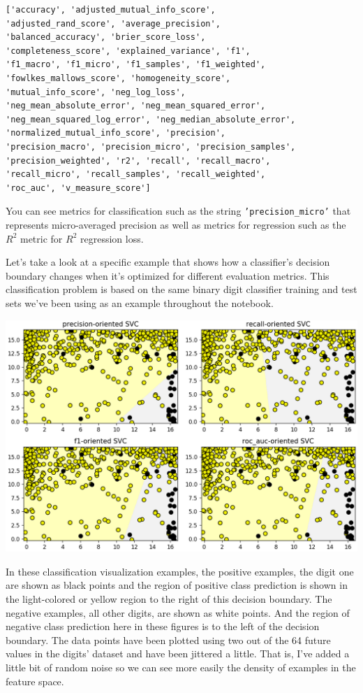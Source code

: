 \begin{multicols}{2}
{\begin{verbatim}
['accuracy', 'adjusted_mutual_info_score', 
'adjusted_rand_score', 'average_precision', 
'balanced_accuracy', 'brier_score_loss', 
'completeness_score', 'explained_variance', 'f1', 
'f1_macro', 'f1_micro', 'f1_samples', 'f1_weighted',
'fowlkes_mallows_score', 'homogeneity_score', 
'mutual_info_score', 'neg_log_loss', 
'neg_mean_absolute_error', 'neg_mean_squared_error',
'neg_mean_squared_log_error', 'neg_median_absolute_error', 
'normalized_mutual_info_score', 'precision', 
'precision_macro', 'precision_micro', 'precision_samples',
'precision_weighted', 'r2', 'recall', 'recall_macro', 
'recall_micro', 'recall_samples', 'recall_weighted', 
'roc_auc', 'v_measure_score']
\end{verbatim}
}

You can see metrics for classification such as the string \texttt{'precision_micro'} that represents micro-averaged precision as well as metrics for regression such as the $R^2$ metric for $R^2$ regression loss. 

Let's take a look at a specific example that shows how a classifier's decision boundary changes when it's optimized for different evaluation metrics. This classification problem is based on the same binary digit classifier training and test sets we've been using as an example throughout the notebook. 

\begin{center}
\includegraphics[width=\linewidth]{img/Optimizing-Classifier.png} 
\end{center}


In these classification visualization examples, the positive examples, the digit one are shown as black points and the region of positive class prediction is shown in the light-colored or yellow region to the right of this decision boundary. The negative examples, all other digits, are shown as white points. And the region of negative class prediction here in these figures is to the left of the decision boundary. The data points have been plotted using two out of the 64 future values in the digits' dataset and have been jittered a little. That is, I've added a little bit of random noise so we can see more easily the density of examples in the feature space. 


\end{multicols}
